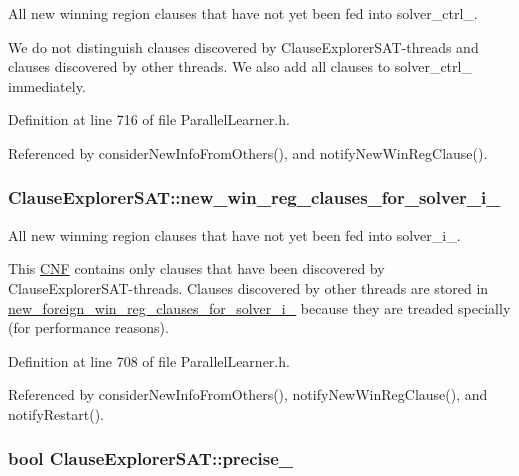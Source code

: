 All new winning region clauses that have not yet been fed into solver\-\_\-ctrl\-\_\-. 

We do not distinguish clauses discovered by Clause\-Explorer\-S\-A\-T-\/threads and clauses discovered by other threads. We also add all clauses to solver\-\_\-ctrl\-\_\- immediately. 

Definition at line 716 of file Parallel\-Learner.\-h.



Referenced by consider\-New\-Info\-From\-Others(), and notify\-New\-Win\-Reg\-Clause().

\hypertarget{classClauseExplorerSAT_a2c3e73b4c0529b9139354a965d34e81f}{
\subsubsection[{new\-\_\-win\-\_\-reg\-\_\-clauses\-\_\-for\-\_\-solver\-\_\-i\-\_\-}]{ Clause\-Explorer\-S\-A\-T\-::new\-\_\-win\-\_\-reg\-\_\-clauses\-\_\-for\-\_\-solver\-\_\-i\-\_\-\hspace{0.3cm}{\ttfamily [protected]}}}\label{classClauseExplorerSAT_a2c3e73b4c0529b9139354a965d34e81f}


All new winning region clauses that have not yet been fed into solver\-\_\-i\-\_\-. 

This \hyperlink{classCNF}{C\-N\-F} contains only clauses that have been discovered by Clause\-Explorer\-S\-A\-T-\/threads. Clauses discovered by other threads are stored in \hyperlink{classClauseExplorerSAT_a70c8edd590d75994ee354d591909cd35}{new\-\_\-foreign\-\_\-win\-\_\-reg\-\_\-clauses\-\_\-for\-\_\-solver\-\_\-i\-\_\-} because they are treaded specially (for performance reasons). 

Definition at line 708 of file Parallel\-Learner.\-h.



Referenced by consider\-New\-Info\-From\-Others(), notify\-New\-Win\-Reg\-Clause(), and notify\-Restart().

\hypertarget{classClauseExplorerSAT_a3edc259c6f39cce098ab18a2dce7f262}{
\subsubsection[{precise\-\_\-}]{\setlength{\rightskip}{0pt plus 5cm}bool Clause\-Explorer\-S\-A\-T\-::precise\-\_\-\hspace{0.3cm}{\ttfamily [protected]}}}\label{classClauseExplorerSAT_a3edc259c6f39cce098ab18a2dce7f262}



